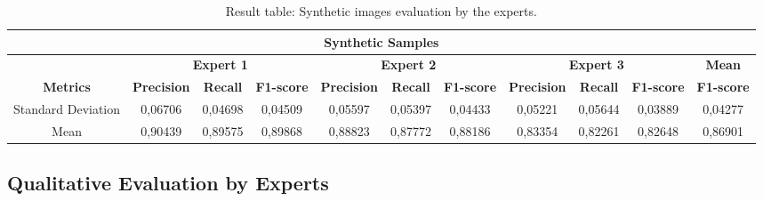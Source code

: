 \documentclass{ieeeaccess}
\begin{document}
\begin{table}[h!]
\centering
\caption{Result table: Synthetic images evaluation by the experts.}
\label{tab:synthetic_images_evaluation}
\begin{tabular}{|c|c|c|c|c|c|c|c|c|c|c|}
\hline
\multicolumn{11}{|c|}{\textbf{Synthetic Samples}} \\
\hline
~ & \multicolumn{3}{c|}{\textbf{Expert 1}} & \multicolumn{3}{c|}{\textbf{Expert 2}} & \multicolumn{3}{c|}{\textbf{Expert 3}} & \textbf{Mean} \\
\cline{2-11}
\textbf{Metrics} & \textbf{Precision} & \textbf{Recall} & \textbf{F1-score} & \textbf{Precision} & \textbf{Recall} & \textbf{F1-score} & \textbf{Precision} & \textbf{Recall} & \textbf{F1-score} & \textbf{F1-score} \\
\hline
Standard Deviation & 0,06706 & 0,04698 & 0,04509 & 0,05597 & 0,05397 & 0,04433 & 0,05221 & 0,05644 & 0,03889 & 0,04277 \\
\hline
Mean & 0,90439 & 0,89575 & 0,89868 & 0,88823 & 0,87772 & 0,88186 & 0,83354 & 0,82261 & 0,82648 & 0,86901 \\
\hline
\end{tabular}
\end{table}



\begin{table}[h!]
\centering
\caption{Statistics for sinthesys group \texttt{0bdd44d530} with 100 images}
\end{table}



\subsection{Qualitative Evaluation by Experts}
\end{document}

